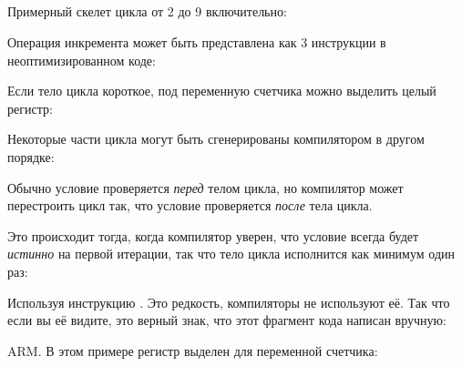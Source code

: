 ﻿\subsection{\Conclusion{}}

Примерный скелет цикла от 2 до 9 включительно:



Операция инкремента может быть представлена как 3 инструкции в неоптимизированном коде:



Если тело цикла короткое, под переменную счетчика можно выделить целый регистр:



Некоторые части цикла могут быть сгенерированы компилятором в другом порядке:



Обычно условие проверяется \emph{перед} телом цикла, но компилятор может перестроить цикл так, 
что условие проверяется \emph{после} тела цикла.

Это происходит тогда, когда компилятор уверен, что условие всегда будет \emph{истинно} на первой итерации,
так что тело цикла исполнится как минимум один раз:



Используя инструкцию . Это редкость, компиляторы не используют её.
Так что если вы её видите, это верный знак, что этот фрагмент кода написан вручную:



ARM. 
В этом примере регистр  выделен для переменной счетчика:




